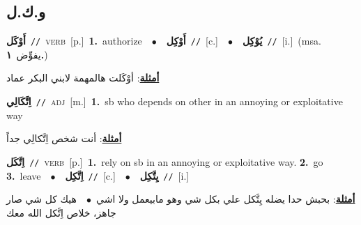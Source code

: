 \documentclass[10pt,a4paper,twoside]{article} %
\begin{document}
\begin{multicols}{2}
\vspace{-3mm}
\subsection*{\color{blue}\foreignlanguage{arabic}{و.ك.ل}\color{blue}{}} 

{\setlength\topsep{0pt}\textbf{\foreignlanguage{arabic}{أَوْكَل}}\ {\color{gray}\texttt{//}\color{black}}\ \textsc{verb}\ [p.]\ \textbf{1.}~authorize\ \ $\bullet$\ \ \setlength\topsep{0pt}\textbf{\foreignlanguage{arabic}{أَوْكِل}}\ {\color{gray}\texttt{//}\color{black}}\ [c.]\ \ $\bullet$\ \ \setlength\topsep{0pt}\textbf{\foreignlanguage{arabic}{يُوْكِل}}\ {\color{gray}\texttt{//}\color{black}}\ [i.]\ \color{gray}(msa. \foreignlanguage{arabic}{يفوِّض}~\foreignlanguage{arabic}{\textbf{١.}})\color{black}\  \begin{flushright}\color{gray}\foreignlanguage{arabic}{\textbf{\underline{\foreignlanguage{arabic}{أمثلة}}}: أوْكَلت هالمهمة لابني البكر عماد}\end{flushright}\color{black}} \vspace{2mm}

{\setlength\topsep{0pt}\textbf{\foreignlanguage{arabic}{اِتَّكَالِي}}\ {\color{gray}\texttt{//}\color{black}}\ \textsc{adj}\ [m.]\ \textbf{1.}~sb who depends on other in an annoying or exploitative way\  \begin{flushright}\color{gray}\foreignlanguage{arabic}{\textbf{\underline{\foreignlanguage{arabic}{أمثلة}}}: أنت شخص اِتَّكالِي جداً}\end{flushright}\color{black}} \vspace{2mm}

{\setlength\topsep{0pt}\textbf{\foreignlanguage{arabic}{اِتَّكَل}}\ {\color{gray}\texttt{//}\color{black}}\ \textsc{verb}\ [p.]\ \textbf{1.}~rely on sb in an annoying or exploitative way.  \textbf{2.}~go  \textbf{3.}~leave\ \ $\bullet$\ \ \setlength\topsep{0pt}\textbf{\foreignlanguage{arabic}{اِتَّكِل}}\ {\color{gray}\texttt{//}\color{black}}\ [c.]\ \ $\bullet$\ \ \setlength\topsep{0pt}\textbf{\foreignlanguage{arabic}{يِتَّكِل}}\ {\color{gray}\texttt{//}\color{black}}\ [i.]\  \begin{flushright}\color{gray}\foreignlanguage{arabic}{\textbf{\underline{\foreignlanguage{arabic}{أمثلة}}}: بحبش حدا يضله يِتَّكل علي بكل شي وهو مابيعمل ولا اشي\ $\bullet$\ \  هيك كل شي صار جاهز، خلاص اِتَّكل الله معك}\end{flushright}\color{black}} \vspace{2mm}


\end{multicols}
\end{document}
